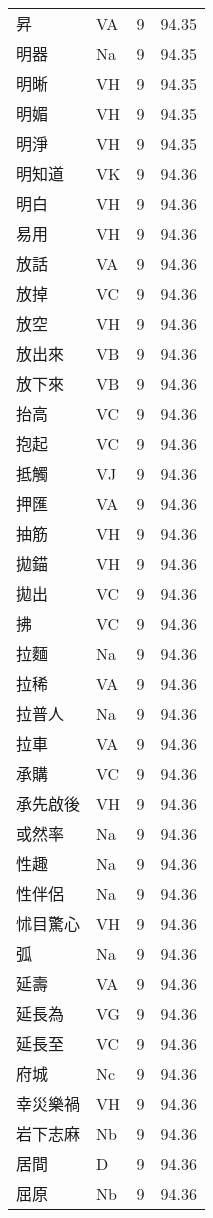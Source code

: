 \documentclass[twocolumn]{book}
\begin{document}
\begin{supertabular}{llrr}
昇 & VA & 9 &  94.35\\
明器 & Na & 9 &  94.35\\
明晰 & VH & 9 &  94.35\\
明媚 & VH & 9 &  94.35\\
明淨 & VH & 9 &  94.35\\
明知道 & VK & 9 &  94.36\\
明白 & VH & 9 &  94.36\\
易用 & VH & 9 &  94.36\\
放話 & VA & 9 &  94.36\\
放掉 & VC & 9 &  94.36\\
放空 & VH & 9 &  94.36\\
放出來 & VB & 9 &  94.36\\
放下來 & VB & 9 &  94.36\\
抬高 & VC & 9 &  94.36\\
抱起 & VC & 9 &  94.36\\
抵觸 & VJ & 9 &  94.36\\
押匯 & VA & 9 &  94.36\\
抽筋 & VH & 9 &  94.36\\
拋錨 & VH & 9 &  94.36\\
拋出 & VC & 9 &  94.36\\
拂 & VC & 9 &  94.36\\
拉麵 & Na & 9 &  94.36\\
拉稀 & VA & 9 &  94.36\\
拉普人 & Na & 9 &  94.36\\
拉車 & VA & 9 &  94.36\\
承購 & VC & 9 &  94.36\\
承先啟後 & VH & 9 &  94.36\\
或然率 & Na & 9 &  94.36\\
性趣 & Na & 9 &  94.36\\
性伴侶 & Na & 9 &  94.36\\
怵目驚心 & VH & 9 &  94.36\\
弧 & Na & 9 &  94.36\\
延壽 & VA & 9 &  94.36\\
延長為 & VG & 9 &  94.36\\
延長至 & VC & 9 &  94.36\\
府城 & Nc & 9 &  94.36\\
幸災樂禍 & VH & 9 &  94.36\\
岩下志麻 & Nb & 9 &  94.36\\
居間 & D & 9 &  94.36\\
屈原 & Nb & 9 &  94.36\\

\end{supertabular}
\end{document}
